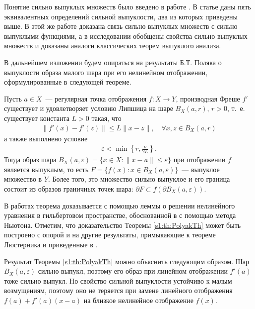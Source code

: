 \documentclass[../main.tex]{subfiles}
\begin{document}
Понятие сильно выпуклых множеств было введено в работе \cite{Polyak1966}.
В статье \cite{vial} даны пять эквивалентных определений сильной выпуклости, два из которых приведены выше. 
В этой же работе доказана связь сильно выпуклых множеств с сильно выпуклыми функциями, а в исследовании \cite{Polovinkin} обобщены свойства сильно выпуклых множеств и доказаны аналоги классических теорем выпуклого анализа.

В дальнейшем изложении будем опираться на результаты Б.Т. Поляка о выпуклости образа малого шара при его нелинейном отображении, сформулированные в следующей теореме. 
\begin{theorem}\label{s1:th:PolyakTh}
 Пусть $a \in X$~--- регулярная точка отображения $f: X \rightarrow Y$, производная Фреше $f'$ существует и удовлетворяет условию Липшица на шаре $B_X(a,r) $, $r > 0$, т.~е. существует константа $ L > 0 $ такая, что
 \begin{gather*}%
 \| f'(x) - f'(z) \| \leqslant L \| x - z \|, \quad \forall x,z \in B_X(a,r)
 \end{gather*}
 а также выполнено условие
 \begin{gather*}
 \varepsilon < \min\left\{r,\frac{\nu}{2L}\right\}.
 \end{gather*}
 Тогда образ шара $B_X(a,\varepsilon) = \{x \in X: \| x - a\| \leqslant \varepsilon\}$ при отображении $f$ является выпуклым, то есть $F = \{f(x): x \in B_X(a,\varepsilon)\}$~--- выпуклое множество в $Y$.
 Более того, это множество сильно выпуклое и его граница состоит из образов граничных точек шара: $\partial F \subset f(\partial B_X(a,\varepsilon))$.
\end{theorem}
 
В работах \cite{Polyak2001, Polyak2001ru} теорема доказывается с помощью леммы о решении нелинейного уравнения в гильбертовом пространстве, обоснованной в \cite{Polyak1964} с помощью метода Ньютона.
Отметим, что доказательство Теоремы \ref{s1:th:PolyakTh} может быть построено с опорой и на другие результаты, примыкающие к теореме Люстерника и приведенные в \cite{Dmitruk1980, Ioffe}.
 
Результат Теоремы \ref{s1:th:PolyakTh} можно объяснить следующим образом.
Шар $B_X(a,\varepsilon)$ сильно выпукл, поэтому его образ при линейном отображении $f'(a)$ тоже сильно выпукл.
Но свойство сильной выпуклости устойчиво к малым возмущениям, поэтому оно не теряется при замене линейного отображения $f(a) + f'(a)(x - a)$ на близкое нелинейное отображение $f(x)$. 
 
\end{document}
